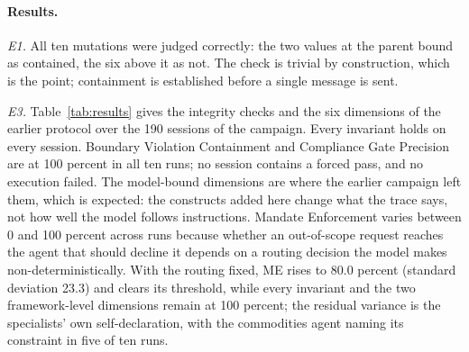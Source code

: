 \documentclass[runningheads]{llncs}
\begin{document}
\paragraph{Results.}
\emph{E1.} All ten mutations were judged correctly: the two values at the parent bound as contained, the six above it as not. The check is trivial by construction, which is the point; containment is established before a single message is sent.

\emph{E3.} Table~\ref{tab:results} gives the integrity checks and the six dimensions of the earlier protocol over the 190 sessions of the campaign. Every invariant holds on every session. Boundary Violation Containment and Compliance Gate Precision are at 100 percent in all ten runs; no session contains a forced pass, and no execution failed. The model-bound dimensions are where the earlier campaign left them, which is expected: the constructs added here change what the trace says, not how well the model follows instructions. Mandate Enforcement varies between 0 and 100 percent across runs because whether an out-of-scope request reaches the agent that should decline it depends on a routing decision the model makes non-deterministically. With the routing fixed, ME rises to 80.0 percent (standard deviation 23.3) and clears its threshold, while every invariant and the two framework-level dimensions remain at 100 percent; the residual variance is the specialists' own self-declaration, with the commodities agent naming its constraint in five of ten runs.
\end{document}
